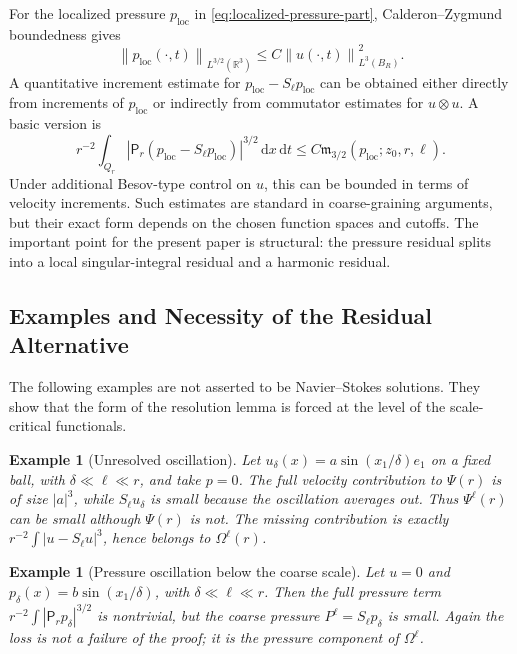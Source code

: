 \documentclass[10pt,a4paper]{amsart}
\numberwithin{equation}{section}
\newtheorem{example}[theorem]{Example}
\newcommand{\R}{\mathbb R}
\newcommand{\loc}{\mathrm{loc}}
\newcommand{\dxdt}{\,\mathrm dx\,\mathrm dt}
\newcommand{\norm}[2]{\left\lVert #1\right\rVert_{#2}}
\newcommand{\Pf}{\mathsf P}
\begin{document}
For the localized pressure $p_{\loc}$ in \eqref{eq:localized-pressure-part}, Calderon--Zygmund boundedness gives
\begin{equation}\label{eq:CZ-pressure-bound}
\norm{p_{\loc}(\cdot,t)}{L^{3/2}(\R^3)}
\le C\norm{u(\cdot,t)}{L^3(B_R)}^2.
\end{equation}
A quantitative increment estimate for $p_{\loc}-S_\ell p_{\loc}$ can be obtained either directly from increments of $p_{\loc}$ or indirectly from commutator estimates for $u\otimes u$.  A basic version is
\begin{equation}\label{eq:ploc-increment-bound}
r^{-2}\int_{Q_r}|\Pf_r(p_{\loc}-S_\ell p_{\loc})|^{3/2}\dxdt
\le C\mathfrak m_{3/2}(p_{\loc};z_0,r,\ell).
\end{equation}
Under additional Besov-type control on $u$, this can be bounded in terms of velocity increments.  Such estimates are standard in coarse-graining arguments, but their exact form depends on the chosen function spaces and cutoffs.  The important point for the present paper is structural: the pressure residual splits into a local singular-integral residual and a harmonic residual.
\subsection{Examples and Necessity of the Residual Alternative}

The following examples are not asserted to be Navier--Stokes solutions.  They show that the form of the resolution lemma is forced at the level of the scale-critical functionals.

\begin{example}[Unresolved oscillation]
Let $u_\delta(x)=a\sin(x_1/\delta)e_1$ on a fixed ball, with $\delta\ll\ell\ll r$, and take $p=0$.  The full velocity contribution to $\Psi(r)$ is of size $|a|^3$, while $S_\ell u_\delta$ is small because the oscillation averages out.  Thus $\Psi^\ell(r)$ can be small although $\Psi(r)$ is not.  The missing contribution is exactly $r^{-2}\int|u-S_\ell u|^3$, hence belongs to $\Omega^\ell(r)$.
\end{example}

\begin{example}[Pressure oscillation below the coarse scale]
Let $u=0$ and $p_\delta(x)=b\sin(x_1/\delta)$, with $\delta\ll\ell\ll r$.  Then the full pressure term $r^{-2}\int|\Pf_r p_\delta|^{3/2}$ is nontrivial, but the coarse pressure $P^\ell=S_\ell p_\delta$ is small.  Again the loss is not a failure of the proof; it is the pressure component of $\Omega^\ell$.
\end{example}
\end{document}
